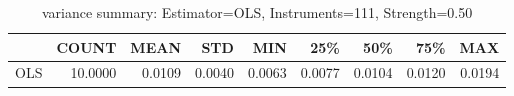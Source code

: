 \begin{table}[ht]
\centering
\caption{variance summary: Estimator=OLS, Instruments=111, Strength=0.50}
\begin{tabular}{lrrrrrrrr}
\toprule
 & COUNT & MEAN & STD & MIN & 25\% & 50\% & 75\% & MAX \\
\midrule
OLS & 10.0000 & 0.0109 & 0.0040 & 0.0063 & 0.0077 & 0.0104 & 0.0120 & 0.0194 \\
\bottomrule
\end{tabular}
\end{table}
